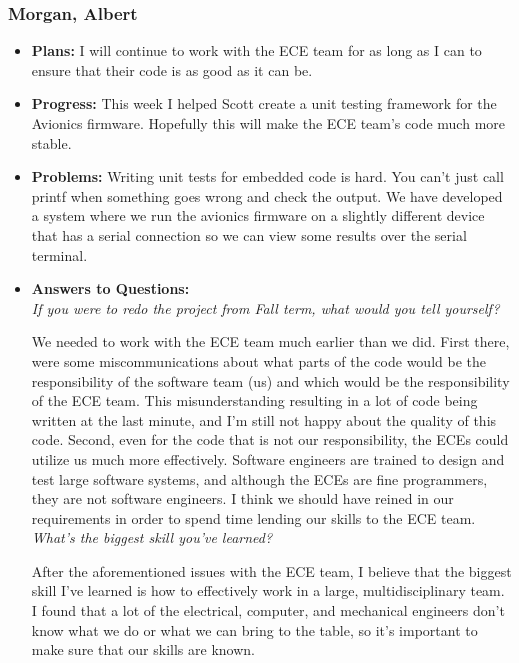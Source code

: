 \documentclass[10pt,draftclsnofoot,onecolumn]{IEEEtran}
\begin{document}
\subsubsection{Morgan, Albert}
\begin{itemize}
	\item \textbf{Plans: }
	I will continue to work with the ECE team for as long as I can to ensure that their code is as good as it can be.
	\item \textbf{Progress: }
	This week I helped Scott create a unit testing framework for the Avionics firmware. Hopefully this will make the ECE team's code much more stable.
	\item \textbf{Problems: }
	Writing unit tests for embedded code is hard. You can't just call printf when something goes wrong and check the output. We have developed a system where we run the avionics firmware on a slightly different device that has a serial connection so we can view some results over the serial terminal.
	\item\textbf{Answers to Questions: }\\
	\textit{If you were to redo the project from Fall term, what would you tell yourself?}

	We needed to work with the ECE team much earlier than we did. First there, were some miscommunications about what parts of the code would be the responsibility of the software team (us) and which would be the responsibility of the ECE team. This misunderstanding resulting in a lot of code being written at the last minute, and I'm still not happy about the quality of this code. Second, even for the code that is not our responsibility, the ECEs could utilize us much more effectively. Software engineers are trained to design and test large software systems, and although the ECEs are fine programmers, they are not software engineers. I think we should have reined in our requirements in order to spend time lending our skills to the ECE team.\\

	\textit{What's the biggest skill you've learned?}

	After the aforementioned issues with the ECE team, I believe that the biggest skill I've learned is how to effectively work in a large, multidisciplinary team. I found that a lot of the electrical, computer, and mechanical engineers don't know what we do or what we can bring to the table, so it's important to make sure that our skills are known.\\


\end{itemize}
\end{document}
